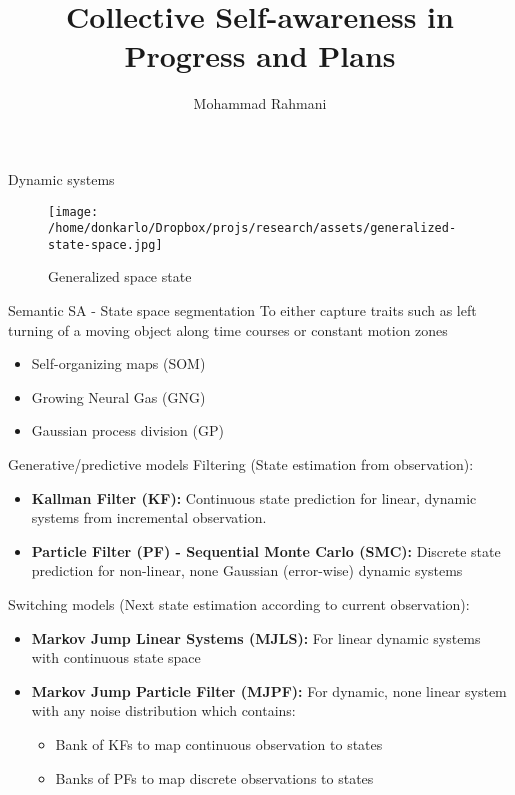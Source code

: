\documentclass[unknownkeysallowed]{beamer}
\title{Collective Self-awareness in Progress and Plans}
\author{Mohammad Rahmani}
\institute{DECIDE Doctoral School}
\begin{document}
	\begin{frame}
		\maketitle
	\end{frame}

	\begin{frame}{Dynamic systems}
		\begin{figure}
			\texttt{[image: /home/donkarlo/Dropbox/projs/research/assets/generalized-state-space.jpg]}
			\caption{Generalized space state}
		\end{figure}
	\end{frame}

	\begin{frame}{Semantic SA - State space segmentation}
		To either capture traits such as left turning of a moving object along time courses or constant motion zones 
		\begin{itemize}
			\item Self-organizing maps (SOM)
			\item Growing Neural Gas (GNG)
			\item Gaussian process division (GP)
		\end{itemize}
	\end{frame}

	\begin{frame}{Generative/predictive models}
		Filtering (State estimation from observation):
		\begin{itemize}
			\item \textbf{Kallman Filter (KF):} Continuous state prediction for linear, dynamic systems from incremental observation.
			\item \textbf{Particle Filter (PF) - Sequential Monte Carlo (SMC):} Discrete state prediction for non-linear, none Gaussian (error-wise) dynamic systems
		\end{itemize}
		Switching models (Next state estimation according to current observation):
		\begin{itemize}
			\item \textbf{Markov Jump Linear Systems (MJLS):} For linear dynamic systems with continuous state space
			\item \textbf{Markov Jump Particle Filter (MJPF):} For dynamic, none linear system with any noise distribution which contains:
			\begin{itemize}
				\item Bank of KFs to map continuous observation to states
				\item Banks of PFs to map discrete observations to states
			\end{itemize}
		\end{itemize}
	\end{frame}
\end{document}
